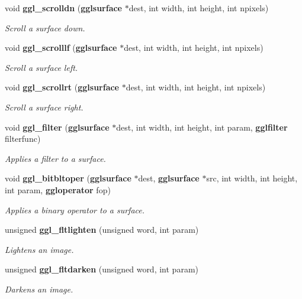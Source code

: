 \begin{CompactItemize}
void {\bf ggl\_\-scrolldn} ({\bf gglsurface} $\ast$dest, int width, int height, int npixels)
\begin{CompactList}\small\item\em Scroll a surface down. \item\end{CompactList}\item 
void {\bf ggl\_\-scrolllf} ({\bf gglsurface} $\ast$dest, int width, int height, int npixels)
\begin{CompactList}\small\item\em Scroll a surface left. \item\end{CompactList}\item 
void {\bf ggl\_\-scrollrt} ({\bf gglsurface} $\ast$dest, int width, int height, int npixels)
\begin{CompactList}\small\item\em Scroll a surface right. \item\end{CompactList}\item 
void {\bf ggl\_\-filter} ({\bf gglsurface} $\ast$dest, int width, int height, int param, {\bf gglfilter} filterfunc)
\begin{CompactList}\small\item\em Applies a filter to a surface. \item\end{CompactList}\item 
void {\bf ggl\_\-bitbltoper} ({\bf gglsurface} $\ast$dest, {\bf gglsurface} $\ast$src, int width, int height, int param, {\bf ggloperator} fop)
\begin{CompactList}\small\item\em Applies a binary operator to a surface. \item\end{CompactList}\item 
unsigned {\bf ggl\_\-fltlighten} (unsigned word, int param)
\begin{CompactList}\small\item\em Lightens an image. \item\end{CompactList}\item 
unsigned {\bf ggl\_\-fltdarken} (unsigned word, int param)
\begin{CompactList}\small\item\em Darkens an image. \item\end{CompactList}\item 

\end{CompactItemize}

